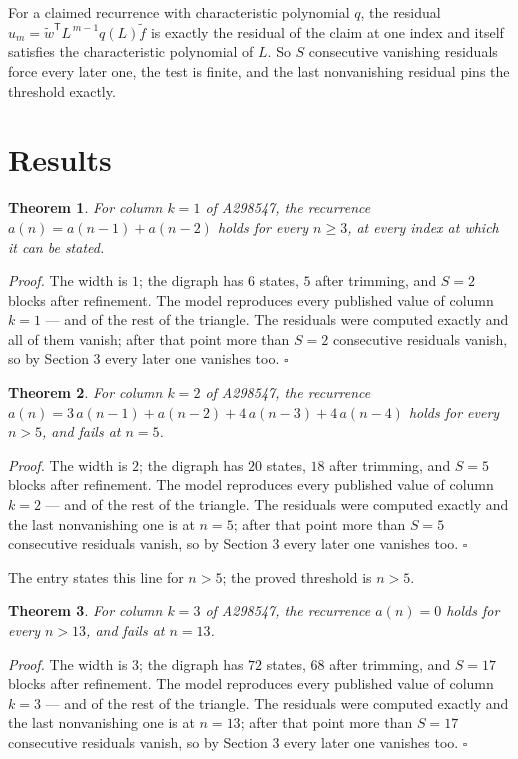 \documentclass[11pt]{article}
\newtheorem{theorem}{Theorem}
\theoremstyle{definition}
\begin{document}
For a claimed recurrence with characteristic polynomial $q$, the residual $u_m = \tilde w^{\mathsf T}L^{\,m-1}q(L)\tilde f$ is exactly the residual of the claim at one index and itself satisfies the characteristic polynomial of $L$. So $S$ consecutive vanishing residuals force every later one, the test is finite, and the last nonvanishing residual pins the threshold exactly.

\section{Results}

\begin{theorem} For column $k = 1$ of A298547, the recurrence $a(n) = a(n-1) + a(n-2)$ holds for every $n \ge 3$, at every index at which it can be stated.\end{theorem}

{\itshape Proof.} The width is $1$; the digraph has $6$ states, $5$ after trimming, and $S = 2$ blocks after refinement. The model reproduces every published value of column $k = 1$ --- and of the rest of the triangle. The residuals were computed exactly and all of them vanish; after that point more than $S = 2$ consecutive residuals vanish, so by Section 3 every later one vanishes too. $\square$

\begin{theorem} For column $k = 2$ of A298547, the recurrence $a(n) = 3\,a(n-1) + a(n-2) + 4\,a(n-3) + 4\,a(n-4)$ holds for every $n > 5$, and fails at $n = 5$.\end{theorem}

{\itshape Proof.} The width is $2$; the digraph has $20$ states, $18$ after trimming, and $S = 5$ blocks after refinement. The model reproduces every published value of column $k = 2$ --- and of the rest of the triangle. The residuals were computed exactly and the last nonvanishing one is at $n = 5$; after that point more than $S = 5$ consecutive residuals vanish, so by Section 3 every later one vanishes too. $\square$

The entry states this line for $n > 5$; the proved threshold is $n > 5$.

\begin{theorem} For column $k = 3$ of A298547, the recurrence $a(n) = 0$ holds for every $n > 13$, and fails at $n = 13$.\end{theorem}

{\itshape Proof.} The width is $3$; the digraph has $72$ states, $68$ after trimming, and $S = 17$ blocks after refinement. The model reproduces every published value of column $k = 3$ --- and of the rest of the triangle. The residuals were computed exactly and the last nonvanishing one is at $n = 13$; after that point more than $S = 17$ consecutive residuals vanish, so by Section 3 every later one vanishes too. $\square$
\end{document}
